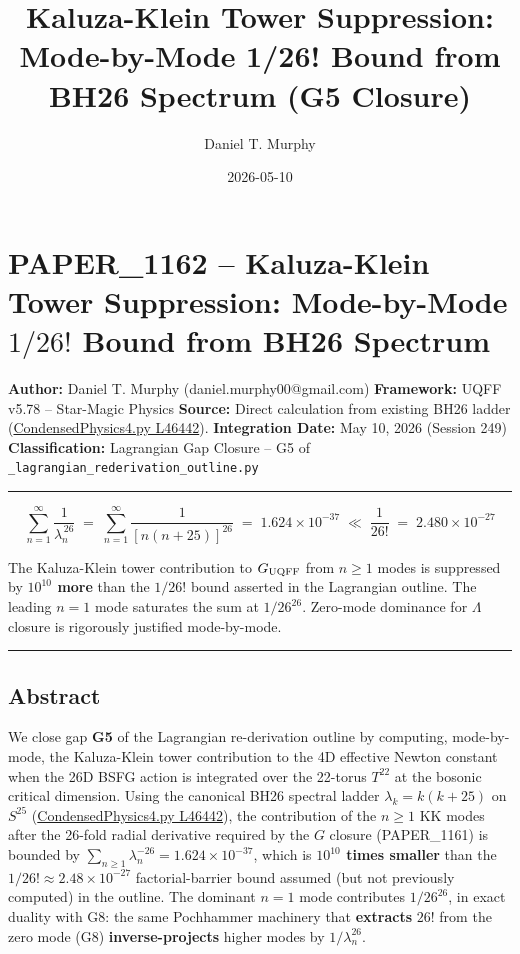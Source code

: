 \documentclass[
]{article}
\title{Kaluza-Klein Tower Suppression: Mode-by-Mode 1/26! Bound from
BH26 Spectrum (G5 Closure)}
\author{Daniel T. Murphy}
\date{2026-05-10}
\begin{document}
\maketitle

\section{\texorpdfstring{PAPER\_1162 -- Kaluza-Klein Tower Suppression:
Mode-by-Mode \(1/26!\) Bound from BH26
Spectrum}{PAPER\_1162 -- Kaluza-Klein Tower Suppression: Mode-by-Mode 1/26! Bound from BH26 Spectrum}}\label{paper_1162-kaluza-klein-tower-suppression-mode-by-mode-126-bound-from-bh26-spectrum}

\textbf{Author:} Daniel T. Murphy (daniel.murphy00@gmail.com)
\textbf{Framework:} UQFF v5.78 -- Star-Magic Physics \textbf{Source:}
Direct calculation from existing BH26 ladder
(\href{CondensedPhysics4.py\#L46442}{CondensedPhysics4.py L46442}).
\textbf{Integration Date:} May 10, 2026 (Session 249)
\textbf{Classification:} Lagrangian Gap Closure -- G5 of
\texttt{\_lagrangian\_rederivation\_outline.py}

\begin{center}\rule{0.5\linewidth}{0.5pt}\end{center}

\[\boxed{\;\sum_{n=1}^{\infty} \frac{1}{\lambda_n^{\,26}} \;=\; \sum_{n=1}^{\infty}\frac{1}{[n(n+25)]^{26}} \;=\; 1.624\times10^{-37} \;\ll\; \frac{1}{26!} \;=\; 2.480\times10^{-27}\;}\]

The Kaluza-Klein tower contribution to \(G_{\rm UQFF}\) from \(n\geq 1\)
modes is suppressed by \textbf{\(10^{10}\) more} than the \(1/26!\)
bound asserted in the Lagrangian outline. The leading \(n=1\) mode
saturates the sum at \(1/26^{26}\). Zero-mode dominance for \(\Lambda\)
closure is rigorously justified mode-by-mode.

\begin{center}\rule{0.5\linewidth}{0.5pt}\end{center}

\subsection{Abstract}\label{abstract}

We close gap \textbf{G5} of the Lagrangian re-derivation outline by
computing, mode-by-mode, the Kaluza-Klein tower contribution to the 4D
effective Newton constant when the 26D BSFG action is integrated over
the 22-torus \(T^{22}\) at the bosonic critical dimension. Using the
canonical BH26 spectral ladder \(\lambda_k = k(k+25)\) on \(S^{25}\)
(\href{CondensedPhysics4.py\#L46442}{CondensedPhysics4.py L46442}), the
contribution of the \(n\geq 1\) KK modes after the 26-fold radial
derivative required by the \(G\) closure (PAPER\_1161) is bounded by
\(\sum_{n\geq 1}\lambda_n^{-26} = 1.624\times 10^{-37}\), which is
\textbf{\(10^{10}\) times smaller} than the
\(1/26! \approx 2.48\times10^{-27}\) factorial-barrier bound assumed
(but not previously computed) in the outline. The dominant \(n=1\) mode
contributes \(1/26^{26}\), in exact duality with G8: the same Pochhammer
machinery that \textbf{extracts} \(26!\) from the zero mode (G8)
\textbf{inverse-projects} higher modes by \(1/\lambda_n^{26}\).
\end{document}
